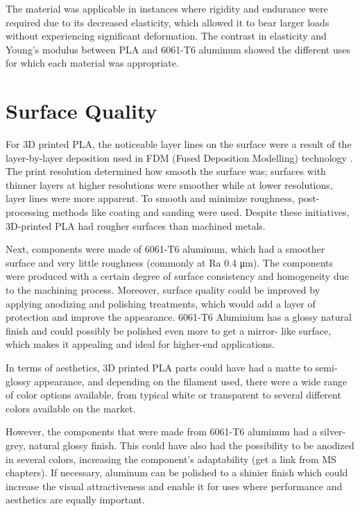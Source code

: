     The material was applicable in instances where rigidity and endurance were required due to its
    decreased elasticity, which allowed it to bear larger loads without experiencing significant deformation.
    The contrast in elasticity and Young's modulus between PLA and 6061-T6 aluminum showed the different uses for which each material was appropriate.
\section{Surface Quality}

    For 3D printed PLA, the noticeable layer lines on the surface were a result of the layer-by-layer
    deposition used in FDM (Fused Deposition Modelling) technology \cite{fusion_deposition_modeling}. The print resolution determined
    how smooth the surface was; surfaces with thinner layers at higher resolutions were smoother while at
    lower resolutions, layer lines were more apparent. To smooth and minimize roughness, post-processing
    methods like coating and sanding were used. Despite these initiatives, 3D-printed PLA had rougher
    surfaces than machined metals.


    Next, components were made of 6061-T6 aluminum, which had a smoother surface and very little roughness
    (commonly at Ra 0.4 μm)\cite{T6_roughness_wiki}. The components were produced with a certain degree of surface consistency
    and homogeneity due to the machining process. Moreover, surface quality could be improved by applying
    anodizing and polishing treatments, which would add a layer of protection and improve the appearance.
    6061-T6 Aluminium has a glossy natural finish and could possibly be polished even more to get a mirror-
    like surface, which makes it appealing and ideal for higher-end applications.

    In terms of aesthetics, 3D printed PLA parts could have had a matte to semi-glossy appearance, and
    depending on the filament used, there were a wide range of color options available, from typical white
    or transparent to several different colors available on the market.

    However, the components that were made from 6061-T6 aluminum had a silver-grey, natural glossy
    finish. This could have also had the possibility to be anodized in several colors, increasing the
    component's adaptability (get a link from MS chapters). If necessary, aluminum can be polished to a
    shinier finish which could increase the visual attractiveness and enable it for uses where performance
    and aesthetics are equally important.

